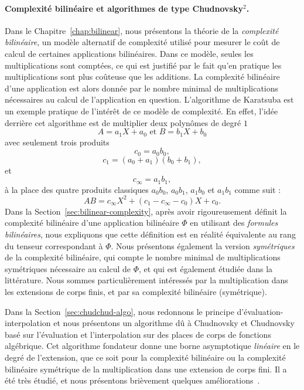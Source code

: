 \paragraph{Complexité bilinéaire et algorithmes de type Chudnovsky$^2$.} Dans le
Chapitre~\ref{chap:bilinear}, nous présentons la théorie de la \emph{complexité
bilinéaire}, un modèle alternatif de complexité utilisé pour mesurer le coût de
calcul de certaines applications bilinéaires. Dans ce modèle, seules les
multiplications sont comptées, ce qui est justifié par le fait qu'en pratique
les multiplications sont plus coûteuse que les additions. La complexité
bilinéaire d'une application est alors donnée par le nombre minimal de
multiplications nécessaires au calcul de l'application en question. L'algorithme
de Karatsuba est un exemple pratique de l'intérêt de ce modèle de complexité. En
effet, l'idée derrière cet algorithme est de multiplier deux polynômes de degré
$1$
\[
  A = a_1 X + a_0\text{ et }B = b_1 X + b_0
\]
avec seulement trois produits
\[
  c_0 = a_0b_0,
\]
\[
  c_1 = (a_0+a_1)(b_0+b_1),
\]
et
\[
  c_\infty = a_1b_1,
\]
à la place des quatre produits classiques $a_0b_0$, $a_0b_1$, $a_1b_0$ et
$a_1b_1$ comme suit :
\[
  AB = c_\infty X^2 + (c_1-c_\infty-c_0) X + c_0.
\]
Dans la Section~\ref{sec:bilinear-complexity}, après avoir rigoureusement
définit la complexité bilinéaire d'une application bilinéaire $\Phi$ en
utilisant des \emph{formules bilinéaires}, nous expliquons que cette définition
est en réalité équivalente au rang du tenseur correspondant à $\Phi$. Nous
présentons également la version \emph{symétriques} de la complexité bilinéaire,
qui compte le nombre minimal de multiplications symétriques nécessaire au calcul
de $\Phi$, et qui est également étudiée dans la littérature. Nous sommes
particulièrement intéressés par la multiplication dans les extensions de corps
finis, et par sa complexité bilinéaire (symétrique).

Dans la Section~\ref{sec:chudchud-algo}, nous redonnons le principe
d'évaluation-interpolation et nous présentons un algorithme dû à Chudnovsky et
Chudnovsky~\cite{CC88} basé sur l'évaluation et l'interpolation sur des places
de corps de fonctions algébrique. Cet algorithme fondateur donne une borne
asymptotique \emph{linéaire} en le degré de l'extension, que ce soit pour la
complexité bilinéaire ou la complexité bilinéaire symétrique de la
multiplication dans une extension de corps fini. Il a été très étudié, et nous
présentons brièvement quelques améliorations~\cite{BR04, CO10, Randriam12}.

